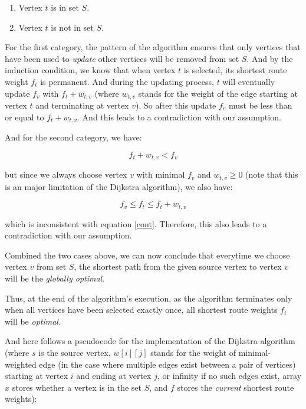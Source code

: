 \documentclass[a4paper,11pt,twocolumn]{article}
\begin{document}
\begin{enumerate}

\item{Vertex $t$ is in set $S$. }
\item{Vertex $t$ is not in set $S$. }

\end{enumerate}

For the first category, the pattern of the algorithm ensures that only vertices that have been used to \emph{update} other vertices will be removed from set $S$. And by the induction condition, we know that when vertex $t$ is selected, its shortest route weight $f_t$ is permanent. And during the updating process, $t$ will eventually update $f_v$ with $f_t + w_{t,v}$ (where $w_{t,v}$ stands for the weight of the edge starting at vertex $t$ and terminating at vertex $v$). So after this update $f_v$ must be less than or equal to $f_t + w_{t,v}$. And this leads to a contradiction with our assumption.

And for the second category, we have:

\begin{equation}
f_t+w_{t,v}<f_v\label{cont}
\end{equation}

but since we always choose vertex $v$ with minimal $f_v$ and $w_{t,v}\ge 0$ (note that this is an major limitation of the Dijkstra algorithm), we also have:

$$f_v\le f_t\le f_t+w_{t,v}$$

which is inconsistent with equation \ref{cont}. Therefore, this also leads to a contradiction with our assumption.

Combined the two cases above, we can now conclude that everytime we choose vertex $v$ from set $S$, the shortest path from the given source vertex to vertex $v$ will be the \emph{globally optimal}.

Thus, at the end of the algorithm's execution, as the algorithm terminates only when all vertices have been selected exactly once, all  shortest route weights $f_i$ will be \emph{optimal}.

And here follows a pseudocode for the implementation of the Dijkstra algorithm (where $s$ is the source vertex, $w[i][j]$ stands for the weight of minimal-weighted edge (in the case where multiple edges exist between a pair of vertices) starting at vertex $i$ and ending at vertex $j$, or infinity if no such edges exist, array $x$ stores whether a vertex is in the set $S$, and $f$ stores the \emph{current} shortest route weights):
\end{document}
